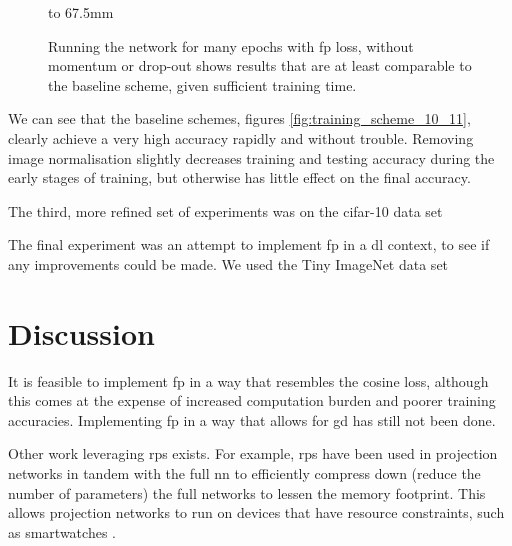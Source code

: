 \begin{figure}[p]
    \hbox to 67.5mm{}%
    \caption[The results of the twelfth training scheme]{Running the network for many epochs with \gls{fp} loss, without momentum or drop-out shows results that are at least comparable to the baseline scheme, given sufficient training time.}
    \label{fig:training_scheme_12}
\end{figure}

We can see that the baseline schemes, figures \ref{fig:training_scheme_10_11}, clearly achieve a very high accuracy rapidly and without trouble. Removing image normalisation slightly decreases training and testing accuracy during the early stages of training, but otherwise has little effect on the final accuracy.
\bigskip

The third, more refined set of experiments was on the \gls{cifar}-10 data set
\bigskip

The final experiment was an attempt to implement \gls{fp} in a \gls{dl} context, to see if any improvements could be made. We used the Tiny ImageNet data set
\bigskip

\section{Discussion}

It is feasible to implement \gls{fp} in a way that resembles the cosine loss, although this comes at the expense of increased computation burden and poorer training accuracies. Implementing \gls{fp} in a way that allows for \gls{gd} has still not been done.
\bigskip

Other work leveraging \gls{rp}s exists. For example, \gls{rp}s have been used in projection networks in tandem with the full \gls{nn} to efficiently compress down (reduce the number of parameters) the full networks to lessen the memory footprint. This allows projection networks to run on devices that have resource constraints, such as smartwatches \cite{projection_net}. 
\bigskip


